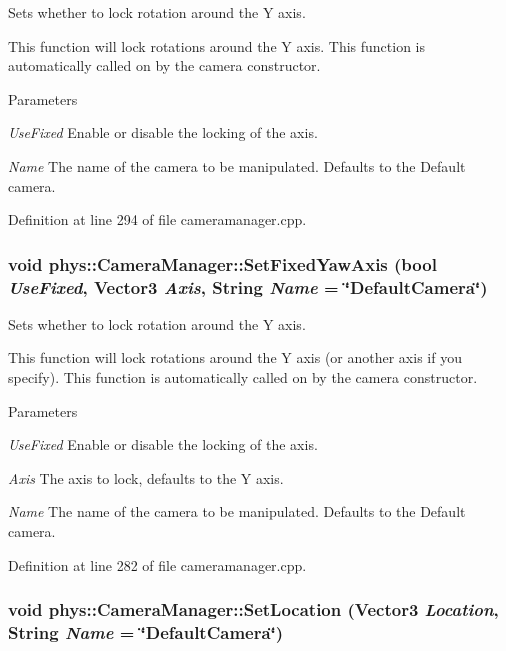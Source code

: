 Sets whether to lock rotation around the Y axis. 

This function will lock rotations around the Y axis. This function is automatically called on by the camera constructor. 
\begin{DoxyParams}{Parameters}
\item[{\em UseFixed}]Enable or disable the locking of the axis. \item[{\em Name}]The name of the camera to be manipulated. Defaults to the Default camera. \end{DoxyParams}


Definition at line 294 of file cameramanager.cpp.

\hypertarget{classphys_1_1CameraManager_ac29a1b3cd34ff2810bee170aa233c77e}{
\subsubsection[{SetFixedYawAxis}]{\setlength{\rightskip}{0pt plus 5cm}void phys::CameraManager::SetFixedYawAxis (bool {\em UseFixed}, \/  {\bf Vector3} {\em Axis}, \/  {\bf String} {\em Name} = {\ttfamily \char`\"{}DefaultCamera\char`\"{}})}}
\label{d9/d91/classphys_1_1CameraManager_ac29a1b3cd34ff2810bee170aa233c77e}


Sets whether to lock rotation around the Y axis. 

This function will lock rotations around the Y axis (or another axis if you specify). This function is automatically called on by the camera constructor. 
\begin{DoxyParams}{Parameters}
\item[{\em UseFixed}]Enable or disable the locking of the axis. \item[{\em Axis}]The axis to lock, defaults to the Y axis. \item[{\em Name}]The name of the camera to be manipulated. Defaults to the Default camera. \end{DoxyParams}


Definition at line 282 of file cameramanager.cpp.

\hypertarget{classphys_1_1CameraManager_a3f1b48057ca2c1cd79f3e61c9fcbe1b4}{
\subsubsection[{SetLocation}]{\setlength{\rightskip}{0pt plus 5cm}void phys::CameraManager::SetLocation ({\bf Vector3} {\em Location}, \/  {\bf String} {\em Name} = {\ttfamily \char`\"{}DefaultCamera\char`\"{}})}}
\label{d9/d91/classphys_1_1CameraManager_a3f1b48057ca2c1cd79f3e61c9fcbe1b4}



